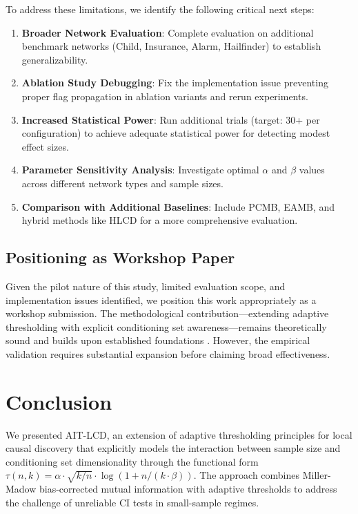 \documentclass{article}
\theoremstyle{plain}
\theoremstyle{definition}
\begin{document}
To address these limitations, we identify the following critical next steps:

\begin{enumerate}
    \item \textbf{Broader Network Evaluation}: Complete evaluation on additional benchmark networks (Child, Insurance, Alarm, Hailfinder) to establish generalizability.
    \item \textbf{Ablation Study Debugging}: Fix the implementation issue preventing proper flag propagation in ablation variants and rerun experiments.
    \item \textbf{Increased Statistical Power}: Run additional trials (target: 30+ per configuration) to achieve adequate statistical power for detecting modest effect sizes.
    \item \textbf{Parameter Sensitivity Analysis}: Investigate optimal $\alpha$ and $\beta$ values across different network types and sample sizes.
    \item \textbf{Comparison with Additional Baselines}: Include PCMB, EAMB, and hybrid methods like HLCD for a more comprehensive evaluation.
\end{enumerate}

\subsection{Positioning as Workshop Paper}

Given the pilot nature of this study, limited evaluation scope, and implementation issues identified, we position this work appropriately as a workshop submission. The methodological contribution---extending adaptive thresholding with explicit conditioning set awareness---remains theoretically sound and builds upon established foundations \citep{lerner2013adaptive}. However, the empirical validation requires substantial expansion before claiming broad effectiveness.

\section{Conclusion}\label{sec:conclusion}

We presented AIT-LCD, an extension of adaptive thresholding principles for local causal discovery that explicitly models the interaction between sample size and conditioning set dimensionality through the functional form $\tau(n,k) = \alpha \cdot \sqrt{k/n} \cdot \log(1 + n/(k \cdot \beta))$. The approach combines Miller-Madow bias-corrected mutual information with adaptive thresholds to address the challenge of unreliable CI tests in small-sample regimes.
\end{document}

